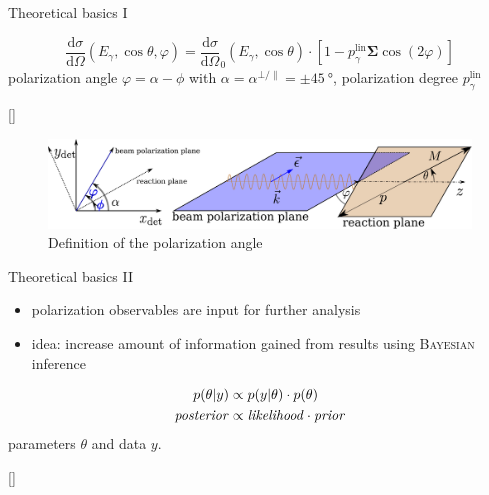 \documentclass[11pt,aspectratio=169,dvipsnames]{beamer}
\newcommand{\thecolor}{black!70!blue}
\begin{document}
\begin{frame}{Theoretical basics I}
		
		
		
		\begin{tcolorbox}[colback=blue!5,colframe=\thecolor,title=Beam asymmetry $\boldsymbol{\Sigma}$]
			$$\frac{\text{d}\sigma}{\text{d}\Omega}(E_\gamma,\cos\theta,\varphi)=\frac{\text{d}\sigma}{\text{d}\Omega}_0(E_\gamma,\cos\theta)\cdot\left[1-p_\gamma^{\text{lin}}\boldsymbol{\Sigma}\cos(2\varphi)\right]$$
			polarization angle $\varphi=\alpha-\phi$ with $\alpha=\alpha^{\bot/\parallel}=\pm\SI{45}{\degree}$, polarization degree $p_\gamma^{\text{lin}}$
			\begin{flushright}
				{}
			\end{flushright}
		\end{tcolorbox}
		
		\begin{figure}
			\centering
			\includegraphics[width=.8\linewidth]{angles.pdf}
			\caption*{Definition of the polarization angle}
		\end{figure}
	\end{frame}
	\begin{frame}{Theoretical basics II}
	\begin{itemize}
		\item polarization observables are input for further analysis
		\item idea: increase amount of information gained from results using \textsc{Bayesian} inference 
	\end{itemize}
	\begin{tcolorbox}[colback=blue!5,colframe=\thecolor,title=\textsc{Bayes'} theorem]
		\begin{align*}
			p(\theta|y)&\propto p(y|\theta)\cdot p(\theta)\\
			\text{\emph{posterior}}&\propto\text{\emph{likelihood}}\cdot\text{\emph{prior}}
		\end{align*}
		parameters $\theta$ and data $y$.
		
		
		\begin{flushright}
			{\scriptsize[\cite{bayes}]}
		\end{flushright}
	\end{tcolorbox}
	\end{frame}
\end{document}
